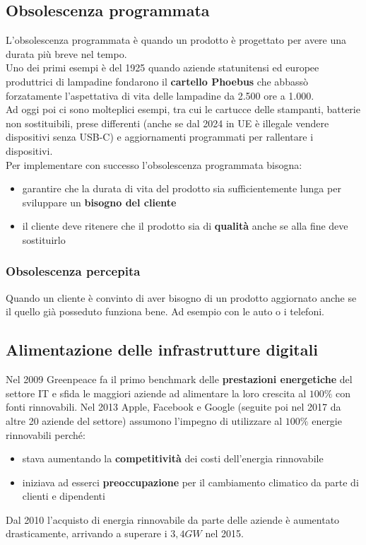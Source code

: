 \subsection{Obsolescenza programmata}
L'obsolescenza programmata è quando un prodotto è progettato per avere una durata più breve nel tempo.\\
Uno dei primi esempi è del 1925 quando aziende statunitensi ed europee produttrici di lampadine fondarono il \textbf{cartello Phoebus} che abbassò forzatamente l'aspettativa di vita delle lampadine da 2.500 ore a  1.000.\\
Ad oggi poi ci sono molteplici esempi, tra cui le cartucce delle stampanti, batterie non sostituibili, prese differenti (anche se dal 2024 in UE è illegale vendere dispositivi senza USB-C) e aggiornamenti programmati per rallentare i dispositivi.\\
Per implementare con successo l'obsolescenza programmata bisogna:
\begin{itemize}
	\item garantire che la durata di vita del prodotto sia sufficientemente lunga per sviluppare un \textbf{bisogno del cliente}
	\item il cliente deve ritenere che il prodotto sia di \textbf{qualità} anche se alla fine deve sostituirlo
\end{itemize}

\subsubsection{Obsolescenza percepita}
Quando un cliente è convinto di aver bisogno di un prodotto aggiornato anche se il quello già posseduto funziona bene. Ad esempio con le auto o i telefoni.

\subsection{Alimentazione delle infrastrutture digitali}
Nel 2009 Greenpeace fa il primo benchmark delle \textbf{prestazioni energetiche} del settore IT e sfida le maggiori aziende ad alimentare la loro crescita al $100\%$ con fonti rinnovabili. Nel 2013 Apple, Facebook e Google (seguite poi nel 2017 da altre 20 aziende del settore) assumono l'impegno di utilizzare al $100\%$ energie rinnovabili perché:
\begin{itemize}
	\item stava aumentando la \textbf{competitività} dei costi dell'energia rinnovabile
	\item iniziava ad esserci \textbf{preoccupazione} per il cambiamento climatico da parte di clienti e dipendenti
\end{itemize}
Dal 2010 l'acquisto di energia rinnovabile da parte delle aziende è aumentato drasticamente, arrivando a superare i $3,4GW$ nel 2015.

